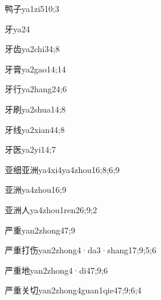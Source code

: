 \begin{verbete}{鸭子}{ya1zi5}{10;3}
\end{verbete}
\begin{verbete}{牙}{ya2}{4}
\end{verbete}
\begin{verbete}{牙齿}{ya2chi3}{4;8}
\end{verbete}
\begin{verbete}{牙膏}{ya2gao1}{4;14}
\end{verbete}
\begin{verbete}{牙行}{ya2hang2}{4;6}
\end{verbete}
\begin{verbete}{牙刷}{ya2shua1}{4;8}
\end{verbete}
\begin{verbete}{牙线}{ya2xian4}{4;8}
\end{verbete}
\begin{verbete}{牙医}{ya2yi1}{4;7}
\end{verbete}
\begin{verbete}{亚细亚洲}{ya4xi4ya4zhou1}{6;8;6;9}
\end{verbete}
\begin{verbete}{亚洲}{ya4zhou1}{6;9}
\end{verbete}
\begin{verbete}{亚洲人}{ya4zhou1ren2}{6;9;2}
\end{verbete}
\begin{verbete}{严重}{yan2zhong4}{7;9}
\end{verbete}
\begin{verbete}{严重打伤}{yan2zhong4·da3·shang1}{7;9;5;6}
\end{verbete}
\begin{verbete}{严重地}{yan2zhong4·di4}{7;9;6}
\end{verbete}
\begin{verbete}{严重关切}{yan2zhong4guan1qie4}{7;9;6;4}
\end{verbete}
